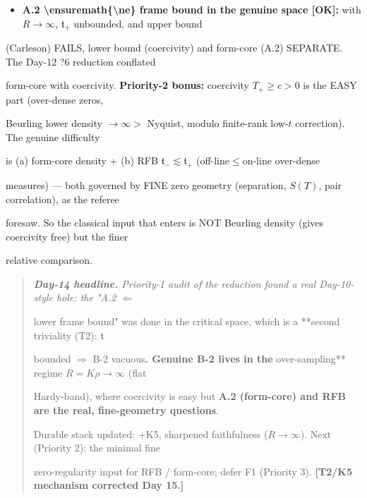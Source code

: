 \documentclass[10pt]{article}
\begin{document}
\begin{itemize}
\item \textbf{A.2 \textbackslash{}ensuremath\{\textbackslash{}ne\} frame bound in the genuine space [OK]:} with $R\to\infty$, $\mathfrak t_+$ unbounded, and upper bound
\end{itemize}
  (Carleson) FAILS, lower bound (coercivity) and form-core (A.2) SEPARATE. The Day-12 ?6 reduction conflated\par
  form-core with coercivity. \textbf{Priority-2 bonus:} coercivity $T_+\ge c>0$ is the EASY part (over-dense zeros,\par
  Beurling lower density $\to\infty>$ Nyquist, modulo finite-rank low-$t$ correction). The genuine difficulty\par
  is (a) form-core density + (b) RFB $\mathfrak t_-\lesssim\mathfrak t_+$ (off-line$\le$on-line over-dense\par
  measures) --- both governed by FINE zero geometry (separation, $S(T)$, pair correlation), as the referee\par
  foresaw. So the classical input that enters is NOT Beurling density (gives coercivity free) but the finer\par
  relative comparison.\par

\begin{quote}\itshape
\textbf{Day-14 headline.} Priority-1 audit of the reduction found a real Day-10-style hole: the "A.2 $\Leftarrow$\par
lower frame bound" was done in the critical space, which is a **second triviality (T2): $\mathfrak t$\par
bounded \ensuremath{\Rightarrow} B-2 vacuous\textbf{. Genuine B-2 lives in the }over-sampling** regime $R=K\rho\to\infty$ (flat\par
Hardy-band), where coercivity is easy but \textbf{A.2 (form-core) and RFB are the real, fine-geometry questions}.\par
Durable stack updated: +K5, sharpened faithfulness ($R\to\infty$). Next (Priority 2): the minimal fine\par
zero-regularity input for RFB / form-core; defer F1 (Priority 3). \textbf{[T2/K5 mechanism corrected Day 15.]}\par
\end{quote}
\end{document}
